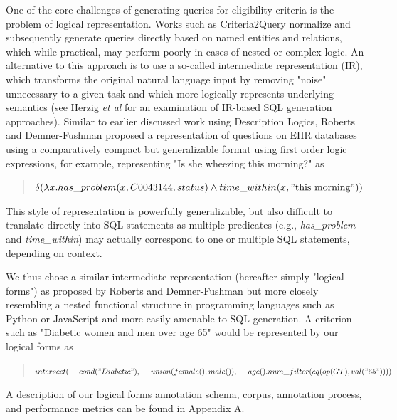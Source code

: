 \documentclass[../main.tex]{subfiles}
\begin{document}
\noindent One of the core challenges of generating queries for eligibility criteria is the problem of logical representation. Works such as Criteria2Query \cite{yuan2019criteria2query} normalize and subsequently generate queries directly based on named entities and relations, which while practical, may perform poorly in cases of nested or complex logic. An alternative to this approach is to use a so-called intermediate representation (IR), which transforms the original natural language input by removing "noise" unnecessary to a given task and which more logically represents underlying semantics (see Herzig \textit{et al} \cite{herzig2021unlocking} for an examination of IR-based SQL generation approaches). Similar to earlier discussed work using Description Logics, Roberts and Demner-Fushman \cite{roberts2016annotating} proposed a representation of questions on EHR databases using a comparatively compact but generalizable format using first order logic expressions, for example, representing "Is she wheezing this morning?" as

\begin{quote}
    \centering
    $\delta( \lambda x.has\_problem(x, C0043144, status) \wedge time\_within(x, \mathrm{"this\ morning"}))$
\end{quote}

\noindent This style of representation is powerfully generalizable, but also difficult to translate directly into SQL statements as multiple predicates (e.g., \textit{has\_problem} and \textit{time\_within}) may actually correspond to one or multiple SQL statements, depending on context.

\noindent We thus chose a similar intermediate representation (hereafter simply "logical forms") as proposed by Roberts and Demner-Fushman but more closely resembling a nested functional structure in programming languages such as Python or JavaScript and more easily amenable to SQL generation. A criterion such as "Diabetic women and men over age 65" would be represented by our logical forms as

\begin{quote}
$intersect( \\
    \mathrm{\ \ \ \ }cond("Diabetic"), \\
    \mathrm{\ \ \ \ }union(female(), male()),\\
    \mathrm{\ \ \ \ }age().num\_filter(eq(op(GT), val("65"))) \\
)$
\end{quote}

\noindent A description of our logical forms annotation schema, corpus, annotation process, and performance metrics can be found in Appendix A. \\
\end{document}
